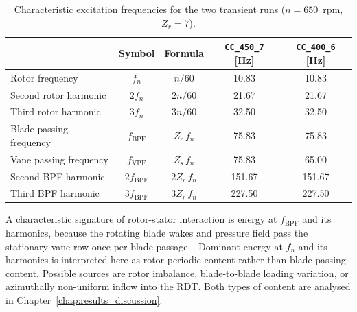 \begin{table}[H]
\centering
\caption[Characteristic excitation frequencies]{Characteristic excitation frequencies for the two transient runs ($n = 650$~rpm, $Z_r = 7$).}
\label{tab:characteristic_freqs}
\begin{tabular}{lcccc}
\hline
 & Symbol & Formula & \texttt{CC\_450\_7} [Hz] & \texttt{CC\_400\_6} [Hz] \\ \hline
Rotor frequency           & $f_n$               & $n/60$         & 10.83  & 10.83  \\
Second rotor harmonic     & $2f_n$              & $2n/60$        & 21.67  & 21.67  \\
Third rotor harmonic      & $3f_n$              & $3n/60$        & 32.50  & 32.50  \\
Blade passing frequency   & $f_{\mathrm{BPF}}$  & $Z_r\,f_n$     & 75.83  & 75.83  \\
Vane passing frequency    & $f_{\mathrm{VPF}}$  & $Z_s\,f_n$     & 75.83  & 65.00  \\
Second BPF harmonic       & $2f_{\mathrm{BPF}}$ & $2Z_r\,f_n$    & 151.67 & 151.67 \\
Third BPF harmonic        & $3f_{\mathrm{BPF}}$ & $3Z_r\,f_n$    & 227.50 & 227.50 \\ \hline
\end{tabular}
\end{table}

A characteristic signature of rotor-stator interaction is energy at \(f_{\mathrm{BPF}}\) and its harmonics, because the rotating blade wakes and pressure field pass the stationary vane row once per blade passage~\cite{Brekke2001}. Dominant energy at \(f_n\) and its harmonics is interpreted here as rotor-periodic content rather than blade-passing content. Possible sources are rotor imbalance, blade-to-blade loading variation, or azimuthally non-uniform inflow into the RDT. Both types of content are analysed in Chapter~\ref{chap:results_discussion}.

\clearpage